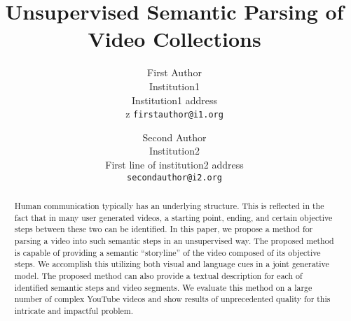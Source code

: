 \documentclass[10pt,twocolumn,letterpaper]{article}
\begin{document}
\title{Unsupervised Semantic Parsing of Video Collections}



\author{First Author\\
Institution1\\
Institution1 address\\z
{\tt\small firstauthor@i1.org}
\and
Second Author\\
Institution2\\
First line of institution2 address\\
{\tt\small secondauthor@i2.org}
}

\maketitle


\begin{abstract}
Human communication typically has an underlying structure. This is reflected in the fact that in many user generated videos, a starting point, ending, and certain objective steps between these two can be identified. In this paper, we propose a method for parsing a video into such semantic steps in an unsupervised way. The proposed method is capable of providing a semantic ``storyline'' of the video composed of its objective steps. We accomplish this utilizing both visual and language cues in a joint generative model. The proposed method can also provide a textual description for each of identified semantic steps and video segments. We evaluate this method on a large number of complex YouTube videos and show results of unprecedented quality for this intricate and impactful problem.
\end{abstract}








%

{\small


}
\end{document}
